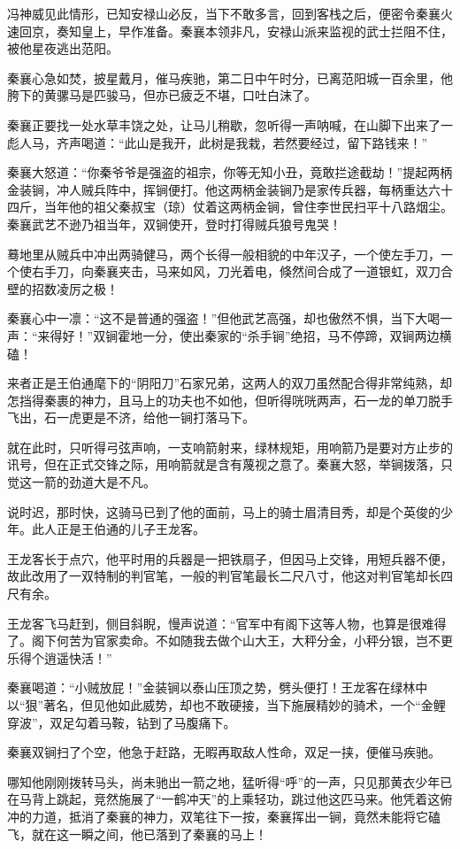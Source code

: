 \documentclass[12pt,oneside]{book}
\begin{document}
冯神威见此情形，已知安禄山必反，当下不敢多言，回到客栈之后，便密令秦襄火速回京，奏知皇上，早作准备。秦襄本领非凡，安禄山派来监视的武士拦阻不住，被他星夜逃出范阳。

秦襄心急如焚，披星戴月，催马疾驰，第二日中午时分，已离范阳城一百余里，他胯下的黄骡马是匹骏马，但亦已疲乏不堪，口吐白沫了。

秦襄正要找一处水草丰饶之处，让马儿稍歇，忽听得一声呐喊，在山脚下出来了一彪人马，齐声喝道：``此山是我开，此树是我栽，若然要经过，留下路钱来！''

秦襄大怒道：``你秦爷爷是强盗的祖宗，你等无知小丑，竟敢拦途截劫！''提起两柄金装锏，冲人贼兵阵中，挥锏便打。他这两柄金装锏乃是家传兵器，每柄重达六十四斤，当年他的祖父秦叔宝（琼）仗着这两柄金锏，曾住李世民扫平十八路烟尘。秦襄武艺不逊乃祖当年，双锏使开，登时打得贼兵狼号鬼哭！

蓦地里从贼兵中冲出两骑健马，两个长得一般相貌的中年汉子，一个使左手刀，一个使右手刀，向秦襄夹击，马来如风，刀光着电，倏然间合成了一道银虹，双刀合壁的招数凌厉之极！

秦襄心中一凛：``这不是普通的强盗！''但他武艺高强，却也傲然不惧，当下大喝一声：``来得好！''双锏霍地一分，使出秦家的``杀手锏''绝招，马不停蹄，双锏两边横磕！

来者正是王伯通麾下的``阴阳刀''石家兄弟，这两人的双刀虽然配合得非常纯熟，却怎挡得秦裹的神力，且马上的功夫也不如他，但听得咣咣两声，石一龙的单刀脱手飞出，石一虎更是不济，给他一锏打落马下。

就在此时，只听得弓弦声响，一支响箭射来，绿林规矩，用响箭乃是要对方止步的讯号，但在正式交锋之际，用响箭就是含有蔑视之意了。秦襄大怒，举锏拨落，只觉这一箭的劲道大是不凡。

说时迟，那时快，这骑马已到了他的面前，马上的骑士眉清目秀，却是个英俊的少年。此人正是王伯通的儿子王龙客。

王龙客长于点穴，他平时用的兵器是一把铁扇子，但因马上交锋，用短兵器不便，故此改用了一双特制的判官笔，一般的判官笔最长二尺八寸，他这对判官笔却长四尺有余。

王龙客飞马赶到，侧目斜睨，慢声说道：``官军中有阁下这等人物，也算是很难得了。阁下何苦为官家卖命。不如随我去做个山大王，大秤分金，小秤分银，岂不更乐得个逍遥快活！''

秦襄喝道：``小贼放屁！''金装锏以泰山压顶之势，劈头便打！王龙客在绿林中以``狠''著名，但见他如此威势，却也不敢硬接，当下施展精妙的骑术，一个``金鲤穿波''，双足勾着马鞍，钻到了马腹痛下。

秦襄双锏扫了个空，他急于赶路，无暇再取敌人性命，双足一挟，便催马疾驰。

哪知他刚刚拨转马头，尚未驰出一箭之地，猛听得``呼''的一声，只见那黄衣少年已在马背上跳起，竞然施展了``一鹤冲天''的上乘轻功，跳过他这匹马来。他凭着这俯冲的力道，抵消了秦襄的神力，双笔往下一按，秦襄挥出一锏，竟然未能将它磕飞，就在这一瞬之间，他已落到了秦襄的马上！
\end{document}

